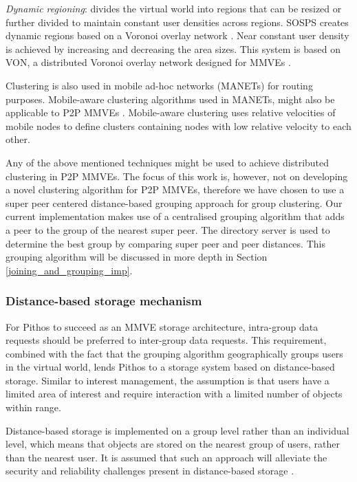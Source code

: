 \emph{Dynamic regioning}: divides the virtual world into regions that can be resized or further divided to maintain constant user densities across regions. SOSPS \cite{self_organising_sps_post} creates dynamic regions based on a Voronoi overlay network \cite{voronoi_diagrams_survey}. Near constant user density is achieved by increasing and decreasing the area sizes. This system is based on VON, a distributed Voronoi overlay network designed for MMVEs \cite{VON_VAST}.

Clustering is also used in mobile ad-hoc networks (MANETs) for routing purposes. Mobile-aware clustering algorithms used in MANETs, might also be applicable to P2P MMVEs \cite{clustering_survey}. Mobile-aware clustering uses relative velocities of mobile nodes to define clusters containing nodes with low relative velocity to each other.

Any of the above mentioned techniques might be used to achieve distributed clustering in P2P MMVEs. The focus of this work is, however, not on developing a novel clustering algorithm for P2P MMVEs, therefore we have chosen to use a super peer centered distance-based grouping approach for group clustering. Our current implementation makes use of a centralised grouping algorithm that adds a peer to the group of the nearest super peer. The directory server is used to determine the best group by  comparing super peer and peer distances. This grouping algorithm will be discussed in more depth in Section \ref{joining_and_grouping_imp}.

\subsubsection{Distance-based storage mechanism}
\label{distance_based_design}

For Pithos to succeed as an MMVE storage architecture, intra-group data requests should be preferred to inter-group data requests. This requirement, combined with the fact that the grouping algorithm geographically groups users in the virtual world, lends Pithos to a storage system based on distance-based storage. Similar to interest management, the assumption is that users have a limited area of interest and require interaction with a limited number of objects within range.

Distance-based storage is implemented on a group level rather than an individual level, which means that objects are stored on the nearest group of users, rather than the nearest user. It is assumed that such an approach will alleviate the security and reliability challenges present in distance-based storage \cite{gilmore_p2p_mmog_state_persistency}.

